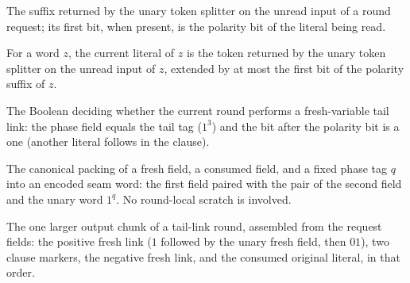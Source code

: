 \begin{definition}
\label{Complexity.satReqPol}
\leanok
{}
The suffix returned by the unary token splitter on the unread input of a round
request; its first bit, when present, is the polarity bit of the literal being
read.
\end{definition}

\begin{definition}
\label{Complexity.satReqLit}
\leanok
{}
For a word $z$, the current literal of $z$ is the token returned by the unary
token splitter on the unread input of $z$, extended by at most the first bit of
the polarity suffix of $z$.
\end{definition}

\begin{definition}
\label{Complexity.satReqLink}
\leanok
{}
The Boolean deciding whether the current round performs a fresh-variable tail
link: the phase field equals the tail tag ($1^3$) and the bit after the polarity
bit is a one (another literal follows in the clause).
\end{definition}

\begin{definition}
\label{Complexity.satReqPack}
\leanok
{}
The canonical packing of a fresh field, a consumed field, and a fixed phase tag
$q$ into an encoded seam word: the first field paired with the pair of the second
field and the unary word $1^q$. No round-local scratch is involved.
\end{definition}

\begin{definition}
\label{Complexity.satReqFragment}
\leanok
{}
The one larger output chunk of a tail-link round, assembled from the request
fields: the positive fresh link ($1$ followed by the unary fresh field, then
$01$), two clause markers, the negative fresh link, and the consumed original
literal, in that order.
\end{definition}


